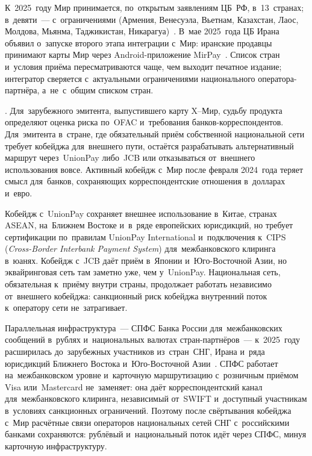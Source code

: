 К~2025~году Мир принимается, по~открытым заявлениям ЦБ~РФ, в~13~странах;
в~девяти~--- с~ограничениями (Армения, Венесуэла, Вьетнам, Казахстан, Лаос,
Молдова, Мьянма, Таджикистан, Никарагуа)~\cite{mir-acceptance-tass-2025}. В~мае
2025~года ЦБ Ирана объявил о~запуске второго этапа интеграции с~Мир:
иранские продавцы принимают карты Мир через Android-приложение
MirPay~\cite{centralbanking-iran-mir-2025}.
Список стран и~условия приёма пересматриваются чаще, чем выходит печатное
издание; интегратор сверяется с~актуальными ограничениями национального
оператора-партнёра, а~не~с~общим списком стран.

. Для~зарубежного эмитента,
выпустившего карту X--Мир, судьбу продукта определяют оценка риска по~OFAC
и~требования банков-корреспондентов. Для~эмитента в~стране, где обязательный приём собственной национальной
сети требует кобейджа для~внешнего пути, остаётся разрабатывать альтернативный маршрут через~UnionPay либо~JCB или отказываться от~внешнего использования вовсе. Активный кобейдж с~Мир после февраля 2024~года теряет смысл для~банков, сохраняющих корреспондентские
отношения в~долларах и~евро.

Кобейдж с~UnionPay сохраняет внешнее использование в~Китае, странах ASEAN,
на~Ближнем Востоке и~в~ряде европейских юрисдикций, но требует сертификации
по~правилам UnionPay International и~подключения к~CIPS (\textit{Cross-Border
Interbank Payment System}) для~межбанковского клиринга в~юанях. Кобейдж с~JCB
даёт приём в~Японии и~Юго-Восточной Азии, но эквайринговая сеть там заметно
уже, чем у~UnionPay. Национальная сеть, обязательная к~приёму внутри страны,
продолжает работать независимо от~внешнего кобейджа: санкционный риск
кобейджа внутренний поток к~оператору сети не~затрагивает.

Параллельная инфраструктура~--- СПФС Банка России для~межбанковских сообщений
в~рублях и~национальных валютах стран-партнёров~--- к~2025~году расширилась
до~зарубежных участников из~стран~СНГ, Ирана и~ряда юрисдикций Ближнего Востока
и~Юго-Восточной Азии~\cite{cbr-spfs}. СПФС работает на~межбанковском уровне и~карточную маршрутизацию с~розничным
приёмом Visa или~Mastercard не~заменяет: она даёт корреспондентский канал
для~межбанковского клиринга, независимый от~SWIFT и~доступный участникам
в~условиях санкционных ограничений. Поэтому после свёртывания кобейджа с~Мир
расчётные связи операторов национальных сетей СНГ с~российскими банками
сохраняются: рублёвый и~национальный поток идёт через СПФС, минуя карточную
инфраструктуру.

